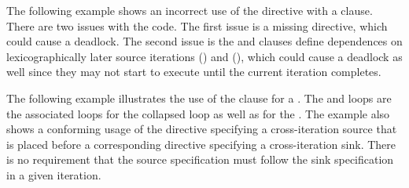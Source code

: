 


The following example shows an incorrect use of the 
directive with a  clause.  There are two issues with the code.  
The first issue is a missing  directive,
which could cause a deadlock.  
The second issue is the  and  
clauses define dependences on lexicographically later 
source iterations () and (), which could cause 
a deadlock as well since they may not start to execute until the current iteration completes.




The following example illustrates the use of the  clause for
a .  The  and  loops are the associated
loops for the collapsed loop as well as for the .
The example also shows a conforming usage of the  directive specifying a cross-iteration source
that is placed before a corresponding  directive specifying a
cross-iteration sink. There is no requirement that the source specification
must follow the sink specification in a given iteration.


